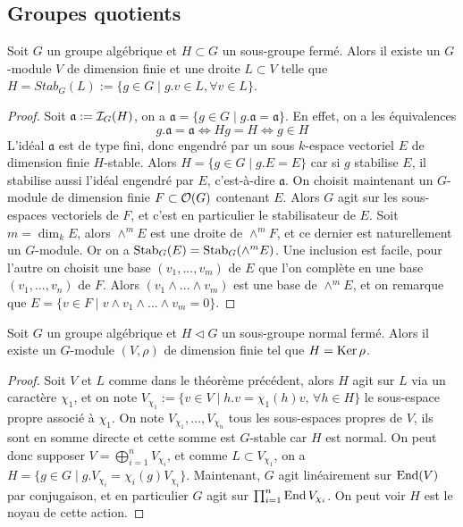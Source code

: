 \subsection{Groupes quotients}
\begin{thm}[Chevalley]
Soit $G$ un groupe algébrique et $H\subset G$ un sous-groupe fermé. Alors il existe un $G$-module $V$ de dimension finie et une droite $L\subset V$ telle que $H=Stab_G(L):=\lbrace g\in G\mid g.v\in L,\forall v\in L\rbrace$.
\end{thm}
\begin{proof}
Soit $\mathfrak{a}:=\mathcal{I}_G(H)$, on a  $\mathfrak{a}=\lbrace g\in G\mid g.\mathfrak{a}=\mathfrak{a}\rbrace$. En effet, on a les équivalences
$$g.\mathfrak{a}=\mathfrak{a}\iff Hg=H\iff g\in H$$
L'idéal $\mathfrak{a}$ est de type fini, donc engendré par un sous $k$-espace vectoriel $E$ de dimension finie $H$-stable. Alors $H=\lbrace g\in G\mid g.E=E\rbrace$ car si $g$ stabilise $E$, il stabilise aussi l'idéal engendré par $E$, c'est-à-dire $\mathfrak{a}$. On choisit maintenant un $G$-module de dimension finie $F\subset \mathcal{O}(G)$ contenant $E$. Alors $G$ agit sur les sous-espaces vectoriels de $F$, et c'est en particulier le stabilisateur de $E$. Soit $m=\dim_k E$, alors $\wedge^mE$ est une droite de $\wedge^mF$, et ce dernier est naturellement un $G$-module. Or on a $\operatorname{Stab}_G(E)=\operatorname{Stab}_G(\wedge^mE)$. Une inclusion est facile, pour l'autre on choisit une base $(v_1,...,v_m)$ de $E$ que l'on complète en une base $(v_1,...,v_n)$ de $F$. Alors $(v_1\wedge...\wedge v_m)$ est une base de $\wedge^mE$, et on remarque que $E=\lbrace v\in F\mid v\wedge v_1\wedge...\wedge v_m=0\rbrace$.
\end{proof}


\begin{thm}[Chevalley]
Soit $G$ un groupe algébrique et $H\lhd G$ un sous-groupe normal fermé. Alors il existe un $G$-module $(V, \rho)$ de dimension finie tel que $H=\operatorname{Ker}{\rho}$.
\end{thm}
\begin{proof}
Soit $V$ et $L$ comme dans le théorème précédent, alors $H$ agit sur $L$ via un caractère $\chi_1$, et on note $V_{\chi_1}:=\lbrace v\in V\mid h.v=\chi_1(h)v,\, \forall h\in H\rbrace$ le sous-espace propre associé à $\chi_1$. On note $V_{\chi_1},...,V_{\chi_n}$ tous les sous-espaces propres de $V$, ils sont en somme directe et cette somme est $G$-stable car $H$ est normal. On peut donc supposer $V=\bigoplus_{i=1}^nV_{\chi_i}$, et comme $L\subset V_{\chi_1}$, on a $H=\lbrace g\in G\mid g.V_{\chi_i}=\chi_i(g)V_{\chi_i}\rbrace$. Maintenant, $G$ agit linéairement sur $\operatorname{End}(V)$ par conjugaison, et en particulier $G$ agit sur $\prod_{i=1}^n\operatorname{End} V_{\chi_i}$. On peut voir $H$ est le noyau de cette action.
\end{proof}

